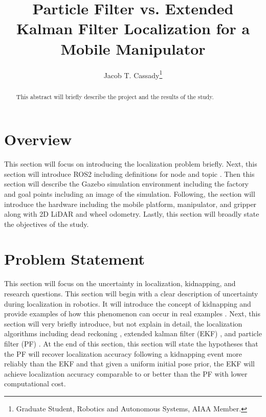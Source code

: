 \documentclass[conf]{new-aiaa}
\title{Particle Filter vs. Extended Kalman Filter Localization for a Mobile Manipulator}
\author{Jacob T. Cassady\footnote{Graduate Student, Robotics and Autonomous Systems, AIAA Member.}}
\affil{Johns Hopkins Whiting School of Engineering, Baltimore, Maryland 21218}
\begin{document}
\maketitle
\begin{abstract}
This abstract will briefly describe the project and the results of the study.
\end{abstract}

\section{Overview}\label{sec:Overview}
This section will focus on introducing the localization problem briefly.
Next, this section will introduce ROS2 including definitions for node and topic \cite{macenski2022ros2}.
Then this section will describe the Gazebo simulation environment including the factory and goal points including an image of the simulation.
Following, the section will introduce the hardware including the mobile platform, manipulator, and gripper along with 2D LiDAR and wheel odometry.
Lastly, this section will broadly state the objectives of the study.

\section{Problem Statement}\label{sec:Problem-Statement}
This section will focus on the uncertainty in localization, kidnapping, and research questions.
This section will begin with a clear description of uncertainty during localization in robotics.
It will introduce the concept of kidnapping and provide examples of how this phenomenon can occur in real examples \cite{DBLP:journals/corr/abs-1106-0222}. 
Next, this section will very briefly introduce, but not explain in detail, the localization algorithms including dead reckoning \cite{ros2_control_mobile_robot_kinematics}, extended kalman filter (EKF) \cite{leonard1991mobile}, and particle filter (PF) \cite{doucet2000sequential}.
At the end of this section, this section will state the hypotheses that the PF will recover localization accuracy following a kidnapping event more reliably than the EKF and that given a uniform initial pose prior, the EKF will achieve localization accuracy comparable to or better than the PF with lower computational cost.
\end{document}
